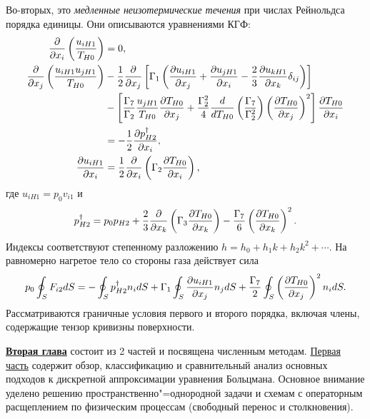 Во-вторых, это \emph{медленные неизотермические течения} при числах Рейнольдса порядка единицы.
Они описываются уравнениями КГФ:
\begin{align*}
    \pder{x_i}\left(\frac{u_{iH1}}{T_{H0}}\right) &= 0, \\
    \pder{x_j}\left(\frac{u_{iH1}u_{jH1}}{T_{H0}}\right)
        &-\frac12\pder{x_j}\left[\Gamma_1\left(
            \pder[u_{iH1}]{x_j} + \pder[u_{jH1}]{x_i} - \frac23\pder[u_{kH1}]{x_k}\delta_{ij}
        \right)\right] \\
        &-\left[
            \frac{\Gamma_7}{\Gamma_2}\frac{u_{jH1}}{T_{H0}}\pder[T_{H0}]{x_j}
            + \frac{\Gamma_2^2}4 \der{T_{H0}}\left(\frac{\Gamma_7}{\Gamma_2^2}\right)
                \left(\pder[T_{H0}]{x_j}\right)^2
        \right]\pder[T_{H0}]{x_i} \\
        &= -\frac12\pder[p_{H2}^\dag]{x_i}, \\
    \pder[u_{iH1}]{x_i} &= \frac12\pder{x_i}\left(\Gamma_2\pder[T_{H0}]{x_i}\right),
\end{align*}
где \(u_{iH1} = p_0v_{i1}\) и
\begin{equation*}
    p_{H2}^\dag = p_0 p_{H2}
        + \frac23\pder{x_k}\left(\Gamma_3\pder[T_{H0}]{x_k}\right)
        - \frac{\Gamma_7}{6}\left(\pder[T_{H0}]{x_k}\right)^2.
\end{equation*}
Индексы соответствуют степенному разложению \(h = h_0 + h_1k + h_2k^2 + \cdots\).
На равномерно нагретое тело со стороны газа действует сила
\begin{equation*}
    p_0 \oint_S F_{i2} \dd{S} =
        - \oint_S p_{H2}^\dag n_i \dd{S} \\
        + \Gamma_1 \oint_S \pder[u_{iH1}]{x_j} n_j \dd{S}
        + \frac{\Gamma_7}{2} \oint_S \left(\pder[T_{H0}]{x_j}\right)^2 n_i \dd{S}.
\end{equation*}
Рассматриваются граничные условия первого и второго порядка, включая члены, содержащие тензор кривизны поверхности.


\underline{\textbf{Вторая глава}} состоит из 2 частей и посвящена численным методам.
\underline{Первая часть} содержит обзор, классификацию и сравнительный анализ основных подходов
к дискретной аппроксимации уравнения Больцмана.
Основное внимание уделено решению пространственно"=однородной задачи и схемам с операторным расщеплением
по физическим процессам (свободный перенос и столкновения).

